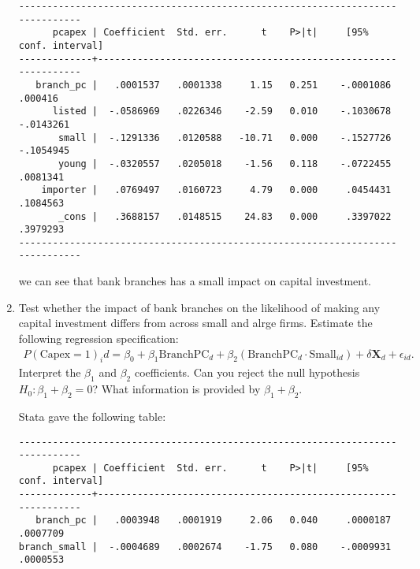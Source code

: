 \documentclass[11pt,twoside,openany]{memoir}
\begin{document}
\begin{question}
\begin{enumerate}[label = (\alph*),itemsep=1pt,topsep=3pt]
{\begin{solution}
                \begin{Verbatim}
------------------------------------------------------------------------------
      pcapex | Coefficient  Std. err.      t    P>|t|     [95% conf. interval]
-------------+----------------------------------------------------------------
   branch_pc |   .0001537   .0001338     1.15   0.251    -.0001086     .000416
      listed |  -.0586969   .0226346    -2.59   0.010    -.1030678   -.0143261
       small |  -.1291336   .0120588   -10.71   0.000    -.1527726   -.1054945
       young |  -.0320557   .0205018    -1.56   0.118    -.0722455    .0081341
    importer |   .0769497   .0160723     4.79   0.000     .0454431    .1084563
       _cons |   .3688157   .0148515    24.83   0.000     .3397022    .3979293
------------------------------------------------------------------------------
                \end{Verbatim}
                we can see that bank branches has a small impact on capital investment. 
            \end{solution}}
        \item Test whether the impact of bank branches on the likelihood of making any capital investment differs from across small and alrge firms. Estimate the following regression specification:
            \begin{equation*}
            \begin{split}
                P(\text{Capex} = 1)_id = \beta_0 + \beta_1\text{BranchPC}_d + \beta_2 (\text{BranchPC}_d \cdot \text{Small}_{id}) + \delta \mathbf{X}_d + \epsilon_{id}.
            \end{split}
            \end{equation*}
        Interpret the $\beta_1$ and $\beta_2$ coefficients. Can you reject the null hypothesis $H_0:\beta_1 + \beta_2 = 0$? What information is provided by $\beta_1 + \beta_2$.
            {\color{blue} \begin{solution}
                Stata gave the following table:
                \begin{Verbatim}
------------------------------------------------------------------------------
      pcapex | Coefficient  Std. err.      t    P>|t|     [95% conf. interval]
-------------+----------------------------------------------------------------
   branch_pc |   .0003948   .0001919     2.06   0.040     .0000187    .0007709
branch_small |  -.0004689   .0002674    -1.75   0.080    -.0009931    .0000553

\end{Verbatim}
\end{solution}}
\end{enumerate}
\end{question}
\end{document}
